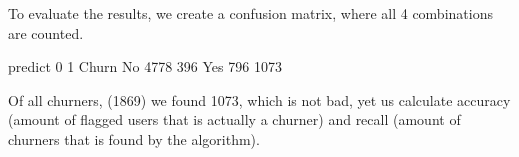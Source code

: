 \documentclass[letterpaper,10pt,english]{jupyterBook}
\begin{document}
\begin{sphinxVerbatim}[commandchars=\\\{\}]
  
\PYG{p}{[}\PYG{p}{]}  
\end{sphinxVerbatim}

\sphinxAtStartPar
To evaluate the results, we create a confusion matrix, where all 4 combinations are counted.

\begin{sphinxVerbatim}[commandchars=\\\{\}]
  \PYG{p}{[}\PYG{p}{[} \PYG{p}{]}\PYG{p}{]}
\end{sphinxVerbatim}

\begin{sphinxVerbatim}[commandchars=\\\{\}]
predict     0     1
Churn              
No       4778   396
Yes       796  1073
\end{sphinxVerbatim}

\sphinxAtStartPar
Of all churners, (1869) we found 1073, which is not bad, yet us calculate accuracy (amount of flagged users that is actually a churner) and recall (amount of churners that is found by the algorithm).

\begin{sphinxVerbatim}[commandchars=\\\{\}]
\PYG{p}{[}\PYG{p}{]}\PYG{p}{[}\PYG{p}{]}\PYG{p}{[}\PYG{p}{]}
\end{sphinxVerbatim}
\end{document}
